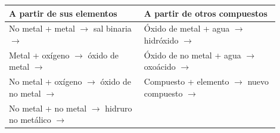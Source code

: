 \begin{center}
    \begin{tabular}{@{}C{0.45\linewidth} C{0.45\linewidth}@{}}
        \toprule
        \textbf{A partir de sus elementos} & \textbf{A partir de otros compuestos} \\
        \midrule
        No metal + metal \(\to\) sal binaria \newline {} \(\rightarrow\)  & Óxido de metal + agua \(\to\) hidróxido \newline {} \(\rightarrow\)  \\[3pt]
        Metal + oxígeno \(\to\) óxido de metal \newline {} \(\rightarrow\)  & Óxido de no metal + agua \(\to\) oxoácido \newline {} \(\rightarrow\)  \\[3pt]
        No metal + oxígeno \(\to\) óxido de no metal \newline {} \(\rightarrow\)  & Compuesto + elemento \(\to\) nuevo compuesto \newline {} \(\rightarrow\)  \\[3pt]
        No metal + no metal \(\to\) hidruro no metálico \newline {} \(\rightarrow\)  &  \\
        \bottomrule
    \end{tabular}
\end{center}

